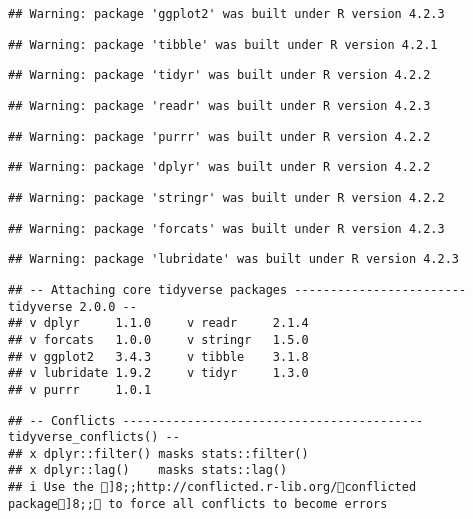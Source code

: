 \documentclass[
]{article}
\begin{document}
\begin{verbatim}
## Warning: package 'ggplot2' was built under R version 4.2.3
\end{verbatim}

\begin{verbatim}
## Warning: package 'tibble' was built under R version 4.2.1
\end{verbatim}

\begin{verbatim}
## Warning: package 'tidyr' was built under R version 4.2.2
\end{verbatim}

\begin{verbatim}
## Warning: package 'readr' was built under R version 4.2.3
\end{verbatim}

\begin{verbatim}
## Warning: package 'purrr' was built under R version 4.2.2
\end{verbatim}

\begin{verbatim}
## Warning: package 'dplyr' was built under R version 4.2.2
\end{verbatim}

\begin{verbatim}
## Warning: package 'stringr' was built under R version 4.2.2
\end{verbatim}

\begin{verbatim}
## Warning: package 'forcats' was built under R version 4.2.3
\end{verbatim}

\begin{verbatim}
## Warning: package 'lubridate' was built under R version 4.2.3
\end{verbatim}

\begin{verbatim}
## -- Attaching core tidyverse packages ------------------------ tidyverse 2.0.0 --
## v dplyr     1.1.0     v readr     2.1.4
## v forcats   1.0.0     v stringr   1.5.0
## v ggplot2   3.4.3     v tibble    3.1.8
## v lubridate 1.9.2     v tidyr     1.3.0
## v purrr     1.0.1
\end{verbatim}

\begin{verbatim}
## -- Conflicts ------------------------------------------ tidyverse_conflicts() --
## x dplyr::filter() masks stats::filter()
## x dplyr::lag()    masks stats::lag()
## i Use the ]8;;http://conflicted.r-lib.org/conflicted package]8;; to force all conflicts to become errors
\end{verbatim}
\end{document}
